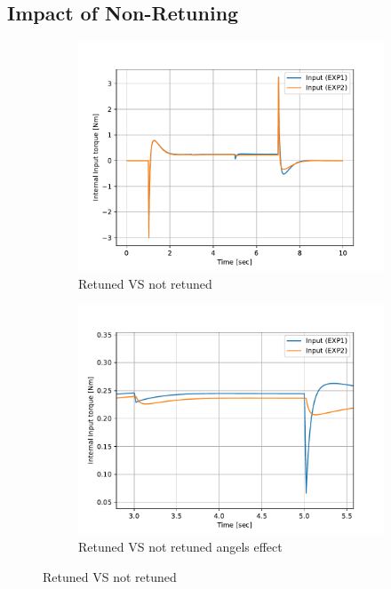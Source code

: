 \subsection{Impact of Non-Retuning}
\begin{figure}[h]
	\centering
	\begin{subfigure}[t]{0.45\textwidth}
		\includegraphics[width=\textwidth]{Retuned VS not retuned}
		\caption{Retuned VS not retuned}
		\label{fig:Retuned VS not retuned}
	\end{subfigure}
	\begin{subfigure}[t]{0.45\textwidth}
		\includegraphics[width=\textwidth]{Retuned VS not retuned angels effect}
		\caption{Retuned VS not retuned angels effect}
		\label{fig:Retuned VS not retuned angels effect}
	\end{subfigure}
	\caption{Retuned VS not retuned}
	\label{fig:Retuned VS not retuned}
\end{figure}
